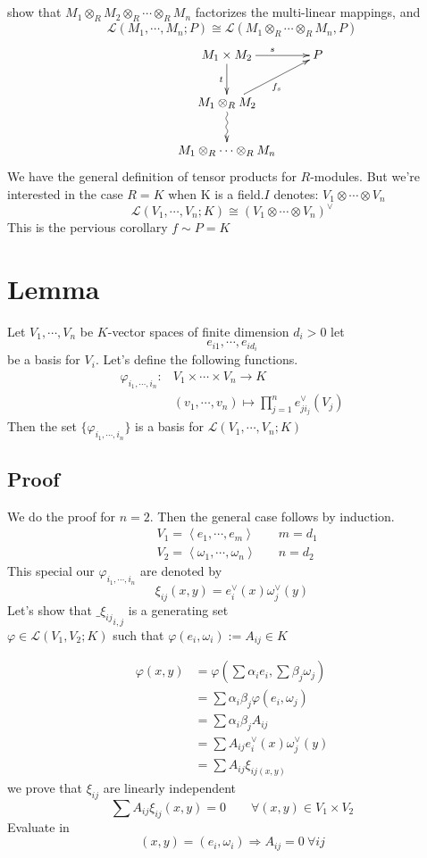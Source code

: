 \documentclass{book}
\begin{document}
\subsection{}
show that $M_1\otimes_RM_2\otimes_R\cdots\otimes_RM_n$ factorizes the multi-linear mappings, and $$\mathscr{L}(M_1,\cdots,M_n;P)\cong \mathscr{L}(M_1\otimes_R\cdots\otimes_RM_n,P)$$
$$\xymatrix{
    &M_1\times M_2\ar[r]^s\ar[d]_t &P\\
    &M_1\otimes_RM_2\ar[ur]_{f_s}\ar@{~>}[d] &\\
    &M_1\otimes_R\cdots\otimes_RM_n &
}
$$
We have the general definition of tensor products for $R$-modules. But we're interested in the case $R=K$ when K is a field.$I$ denotes: $V_1\otimes\cdots\otimes V_n$
$$\mathscr{L}(V_1,\cdots,V_n;K)\cong(V_1\otimes\cdots\otimes V_n)^\vee$$
This is the pervious corollary $f\sim P=K$
\section{Lemma}
Let $V_1,\cdots,V_n$ be $K$-vector spaces of finite dimension $d_i>0$ let $${e_{i1},\cdots,e_{id_i}}$$ be a basis for $V_i$. Let's define the following functions.
$$
\begin{aligned}
    \varphi_{i_1,\cdots,i_n}:&V_1\times\cdots\times V_n\rightarrow K\\
    &(v_1,\cdots,v_n)\mapsto \prod\limits_{j=1}^ne_{ji_j}^\vee(V_j)
\end{aligned}
$$
Then the set $\{\varphi_{i_1,\cdots,i_n}\}$ is a basis for $\mathscr{L}(V_1,\cdots,V_n;K)$
\subsection{Proof}
We do the proof for $n=2$. Then the general case follows by induction.
$$\begin{aligned}
    &V_1=\left<e_1,\cdots,e_m\right>\quad &m=d_1\\
    &V_2=\left<\omega_{1},\cdots,\omega_{n}\right>\quad &n=d_2
\end{aligned}$$
This special our $\varphi_{i_1,\cdots,i_n}$ are denoted by $$
\xi_{ij}(x,y)=e_i^\vee(x)\omega_j^\vee(y)$$
Let's show that ${\_\xi_{ij}}_{i,j}$ is a generating set\\
$\varphi\in \mathscr{L}(V_1,V_2;K)$ such that $\varphi(e_i,\omega_i):=A_{ij}\in K$

$$
\begin{aligned}
    \varphi(x,y)&=\varphi(\sum\alpha_ie_i,\sum\beta_j\omega_j)\\
    &=\sum\alpha_i\beta_j\varphi(e_i,\omega_j)\\
    &=\sum\alpha_i\beta_jA_{ij}\\
    &=\sum A_{ij}e_i^\vee(x)\omega_j^\vee(y)\\
    &=\sum A_{ij}\xi_{ij(x,y)}
\end{aligned}$$
we prove that $\xi_{ij}$ are linearly independent
$$\sum A_{ij}\xi_{ij}(x,y)=0\qquad \forall(x,y)\in V_1\times V_2$$
Evaluate in $$(x,y)=(e_i,\omega_i)\Rightarrow A_{ij}=0\ \forall ij$$
\end{document}
